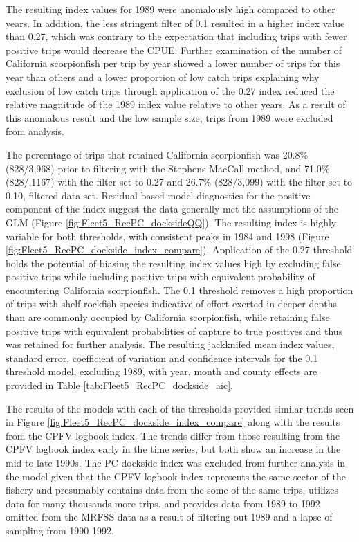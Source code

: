 \documentclass[12pt,]{article}
\begin{document}
The resulting index values for 1989 were anomalously high compared to
other years. In addition, the less stringent filter of 0.1 resulted in a
higher index value than 0.27, which was contrary to the expectation that
including trips with fewer positive trips would decrease the CPUE.
Further examination of the number of California scorpionfish per trip by
year showed a lower number of trips for this year than others and a
lower proportion of low catch trips explaining why exclusion of low
catch trips through application of the 0.27 index reduced the relative
magnitude of the 1989 index value relative to other years. As a result
of this anomalous result and the low sample size, trips from 1989 were
excluded from analysis.

The percentage of trips that retained California scorpionfish was 20.8\%
(828/3,968) prior to filtering with the Stephens-MacCall method, and
71.0\% (828/,1167) with the filter set to 0.27 and 26.7\% (828/3,099)
with the filter set to 0.10, filtered data set. Residual-based model
diagnostics for the positive component of the index suggest the data
generally met the assumptions of the GLM (Figure
\ref{fig:Fleet5_RecPC_docksideQQ}). The resulting index is highly
variable for both thresholds, with consistent peaks in 1984 and 1998
(Figure \ref{fig:Fleet5_RecPC_dockside_index_compare}). Application of
the 0.27 threshold holds the potential of biasing the resulting index
values high by excluding false positive trips while including positive
trips with equivalent probability of encountering California
scorpionfish. The 0.1 threshold removes a high proportion of trips with
shelf rockfish species indicative of effort exerted in deeper depths
than are commonly occupied by California scorpionfish, while retaining
false positive trips with equivalent probabilities of capture to true
positives and thus was retained for further analysis. The resulting
jackknifed mean index values, standard error, coefficient of variation
and confidence intervals for the 0.1 threshold model, excluding 1989,
with year, month and county effects are provided in Table
\ref{tab:Fleet5_RecPC_dockside_aic}.

The results of the models with each of the thresholds provided similar
trends seen in Figure \ref{fig:Fleet5_RecPC_dockside_index_compare}
along with the results from the CPFV logbook index. The trends differ
from those resulting from the CPFV logbook index early in the time
series, but both show an increase in the mid to late 1990s. The PC
dockside index was excluded from further analysis in the model given
that the CPFV logbook index represents the same sector of the fishery
and presumably contains data from the some of the same trips, utilizes
data for many thousands more trips, and provides data from 1989 to 1992
omitted from the MRFSS data as a result of filtering out 1989 and a
lapse of sampling from 1990-1992.
\end{document}
